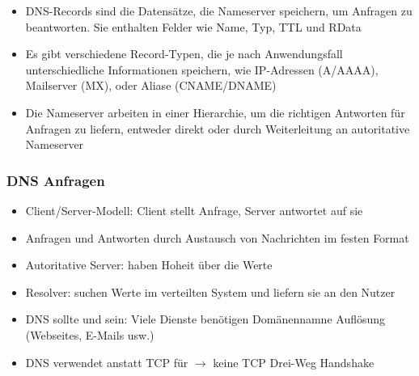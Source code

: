 \begin{infoBox}
    \begin{itemize}
        \item DNS-Records sind die Datensätze, die Nameserver speichern, um Anfragen zu beantworten. Sie enthalten Felder wie Name, Typ, TTL und RData
        \item Es gibt verschiedene Record-Typen, die je nach Anwendungsfall unterschiedliche Informationen speichern, wie IP-Adressen (A/AAAA), Mailserver (MX), oder Aliase (CNAME/DNAME)
        \item Die Nameserver arbeiten in einer Hierarchie, um die richtigen Antworten für Anfragen zu liefern, entweder direkt oder durch Weiterleitung an autoritative Nameserver
    \end{itemize}
\end{infoBox}
\subsubsection*{DNS Anfragen}
\begin{itemize}
    \item Client/Server-Modell: Client stellt Anfrage, Server antwortet auf sie
    \item Anfragen und Antworten durch Austausch von Nachrichten im festen Format
\end{itemize}
\begin{itemize}
    \item Autoritative Server: haben Hoheit über die Werte
    \item Resolver: suchen Werte im verteilten System und liefern sie an den Nutzer
\end{itemize}
\begin{itemize}
    \item DNS sollte  und  sein: Viele Dienste benötigen Domänennamne Auflösung (Webseites, E-Mails usw.)
    \item DNS verwendet  anstatt TCP für  $\rightarrow$ keine TCP Drei-Weg Handshake
\end{itemize}
